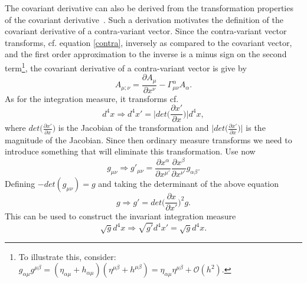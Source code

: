 The covariant derivative can also be derived from the transformation properties of the covariant derivative~\citep{Weinberg1972}. Such a derivation motivates the definition of the covariant derivative of a contra-variant vector. Since the contra-variant vector transforms, cf. equation \eqref{contra}, inversely as compared to the covariant vector, and the first order approximation to the inverse is a minus sign on the second term\footnote{To illustrate this, consider: $g_{\alpha\mu}g^{\mu\beta}=(\eta_{\alpha\mu}+h_{\alpha\mu})(\eta^{\mu\beta}+h^{\mu\beta})=\eta_{\alpha\mu}\eta^{\mu\beta}+\mathcal{O}(h^2)$.}, the covariant derivative of a contra-variant vector is give by
\begin{equation}
	A_{\mu;\nu}=\frac{\partial A_\mu}{\partial x^\nu}-\Gamma^{\alpha}_{\mu\nu}A_\alpha.
\end{equation} 
As for the integration measure, it transforms cf.
\begin{equation}
	d^4x\Rightarrow d^4x'=\bigg|det\bigg(\frac{\partial x'}{\partial x}\bigg)\bigg|d^4x,
\end{equation} 
where $det\big(\frac{\partial x'}{\partial x}\big)$ is the Jacobian of the transformation and $\big|det\big(\frac{\partial x'}{\partial x}\big)\big|$ is the magnitude of the Jacobian. Since then ordinary measure transforms we need to introduce something that will eliminate this transformation. Use now
\begin{equation}
	g_{\mu\nu}\Rightarrow g'_{\mu\nu}=\frac{\partial x^\alpha}{\partial x^{\mu'}}\frac{\partial x^\beta}{\partial x^{\nu'}}g_{\alpha\beta}.
\end{equation} 
Defining $-det(g_{\mu\nu})=g$ and taking the determinant of the above equation
\begin{equation}
	g\Rightarrow g'=det\bigg(\frac{\partial x}{\partial x'}\bigg)^2g.
\end{equation} 
This can be used to construct the invariant integration measure
\begin{equation}
	\sqrt{g}d^4x\Rightarrow \sqrt{g'}d^4x'=\sqrt{g}d^4x.
\end{equation} 

